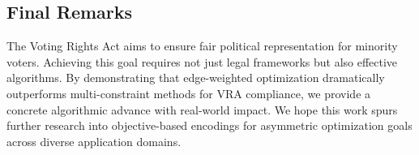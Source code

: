 \subsection{Final Remarks}

The Voting Rights Act aims to ensure fair political representation for minority voters. Achieving this goal requires not just legal frameworks but also effective algorithms. By demonstrating that edge-weighted optimization dramatically outperforms multi-constraint methods for VRA compliance, we provide a concrete algorithmic advance with real-world impact. We hope this work spurs further research into objective-based encodings for asymmetric optimization goals across diverse application domains.
